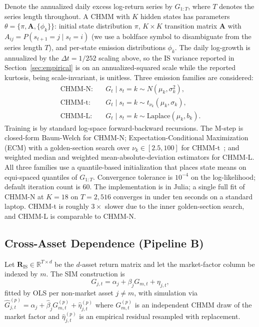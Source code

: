 \documentclass[sigconf,anonymous,nonacm=true]{acmart}
\begin{document}
Denote the annualized daily excess log-return series by $G_{1:T}$,
where $T$ denotes the series length throughout. A CHMM with $K$ hidden
states has parameters $\theta = \{\pi, \mathbf{A}, \{\phi_k\}\}$:
initial state distribution $\pi$, $K \times K$ transition matrix
$\mathbf{A}$ with $A_{ij} = P(s_{t+1} = j \mid s_t = i)$ (we use a
boldface symbol to disambiguate from the series length $T$), and
per-state emission distributions $\phi_k$. The daily log-growth is
annualized by the $\Delta t = 1/252$ scaling above, so the IS variance
reported in Section~\ref{sec:empirical} is on an annualized-squared scale
while the reported kurtosis, being scale-invariant, is unitless. Three emission families are considered:
\begin{align}
  \text{CHMM-N}: \quad & G_t \mid s_t = k \sim N(\mu_k, \sigma_k^2), \\
  \text{CHMM-t}: \quad & G_t \mid s_t = k \sim t_{\nu_k}(\mu_k, \sigma_k), \\
  \text{CHMM-L}: \quad & G_t \mid s_t = k \sim \text{Laplace}(\mu_k, b_k).
\end{align}
Training is by standard log-space forward-backward recursions. The
M-step is closed-form Baum-Welch for CHMM-N; Expectation-Conditional
Maximization (ECM) with a golden-section search over $\nu_k \in
[2.5, 100]$ for CHMM-t~\cite{peel2000robust, liu1995ml}; and weighted
median and weighted mean-absolute-deviation estimators for
CHMM-L. All three families use a quantile-based initialization that
places state means on equi-spaced quantiles of $G_{1:T}$. Convergence
tolerance is $10^{-4}$ on the log-likelihood; default iteration count
is 60. The implementation is in Julia; a single full fit of CHMM-N at
$K = 18$ on $T = 2{,}516$ converges in under ten seconds on a standard
laptop. CHMM-t is roughly $3\times$ slower due to the inner golden-section
search, and CHMM-L is comparable to CHMM-N.

\subsection{Cross-Asset Dependence (Pipeline B)}
\label{sec:methods_ca}

Let $\mathbf{R}_{\text{IS}} \in \mathbb{R}^{T \times d}$ be the $d$-asset
return matrix and let the market-factor column be indexed by $m$. The
SIM construction is
\begin{equation}
  G_{j,t} = \alpha_j + \beta_j G_{m,t} + \eta_{j,t},
  \label{eq:sim}
\end{equation}
fitted by OLS per non-market asset $j \neq m$, with simulation via
$\hat{G}_{j,t}^{(p)} = \hat\alpha_j + \hat\beta_j G_{m,t}^{(p)} +
\hat\eta_{j,t}^{(p)}$ where $G_{m,t}^{(p)}$ is an independent CHMM draw of
the market factor and $\hat\eta_{j,t}^{(p)}$ is an empirical residual
resampled with replacement.
\end{document}
